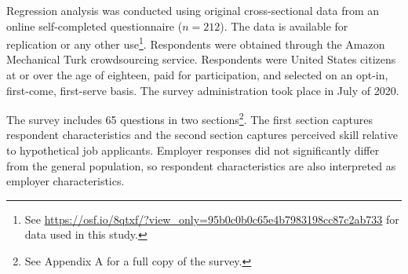 \documentclass[review]{elsarticle}
\begin{document}

Regression analysis was conducted using original cross-sectional data from an online self-completed questionnaire ($n = 212$).
The data is available for replication or any other use\footnote{
    See \url{https://osf.io/8qtxf/?view_only=95b0c0b0c65e4b7983198cc87c2ab733}
    for data used in this study.
}.
Respondents were obtained through the Amazon Mechanical Turk crowdsourcing service.
Respondents were United States citizens at or over the age of eighteen,
paid for participation,
and selected on an opt-in, first-come, first-serve basis.
The survey administration took place in July of 2020.

The survey includes 65 questions in two sections\footnote{See Appendix A for a full copy of the survey.}.
The first section captures respondent characteristics and the second section captures perceived skill relative to hypothetical job applicants.
Employer responses did not significantly differ from the general population,
so respondent characteristics are also interpreted as employer characteristics.
\end{document}
